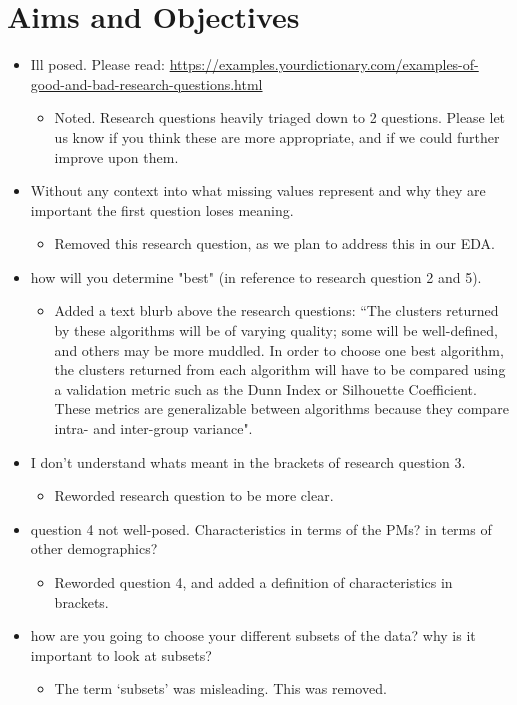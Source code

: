 \documentclass[11pt, a4paper]{article}
\begin{document}
\section*{Aims and Objectives}
\begin{itemize}
\item Ill posed. Please read: \sloppy\url{https://examples.yourdictionary.com/examples-of-good-and-bad-research-questions.html} 
\begin{itemize}
\item Noted. Research questions heavily triaged down to 2 questions. Please let us know if you think these are more appropriate, and if we could further improve upon them. 
\end{itemize}
\item Without any context into what missing values represent and why they are important the first question loses meaning.
\begin{itemize}
\item Removed this research question, as we plan to address this in our EDA. 
\end{itemize} 
\item how will you determine "best" (in reference to research question 2 and 5). 
\begin{itemize}
\item Added a text blurb above the research questions: ``The clusters returned by these algorithms will be of varying quality; some will be well-defined, and others may be more muddled. In order to choose one best algorithm, the clusters returned from each algorithm will have to be compared using a validation metric such as the Dunn Index or Silhouette Coefficient. These metrics are generalizable between algorithms because they compare intra- and inter-group variance". 
\end{itemize}
\item I don't understand whats meant in the brackets of research question 3.
\begin{itemize}
\item Reworded research question to be more clear. 
\end{itemize}
\item question 4 not well-posed. Characteristics in terms of the PMs? in terms of other demographics? 
\begin{itemize}
\item Reworded question 4, and added a definition of characteristics in brackets. 
\end{itemize}
\item how are you going to choose your different subsets of the data? why is it important to look at subsets? 
\begin{itemize}
\item The term `subsets' was misleading. This was removed. 
\end{itemize}
\end{itemize} 
\end{document}
